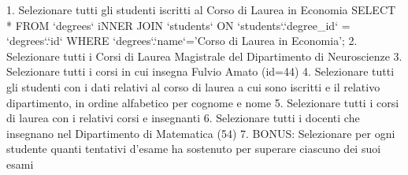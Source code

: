 1. Selezionare tutti gli studenti iscritti al Corso di Laurea in Economia
SELECT * FROM `degrees` iNNER JOIN `students` ON `students`.`degree_id` = `degrees`.`id` WHERE `degrees`.`name`='Corso di Laurea in Economia';
2. Selezionare tutti i Corsi di Laurea Magistrale del Dipartimento di Neuroscienze
3. Selezionare tutti i corsi in cui insegna Fulvio Amato (id=44)
4. Selezionare tutti gli studenti con i dati relativi al corso di laurea a cui sono iscritti e il
relativo dipartimento, in ordine alfabetico per cognome e nome
5. Selezionare tutti i corsi di laurea con i relativi corsi e insegnanti
6. Selezionare tutti i docenti che insegnano nel Dipartimento di Matematica (54)
7. BONUS: Selezionare per ogni studente quanti tentativi d’esame ha sostenuto per
superare ciascuno dei suoi esami